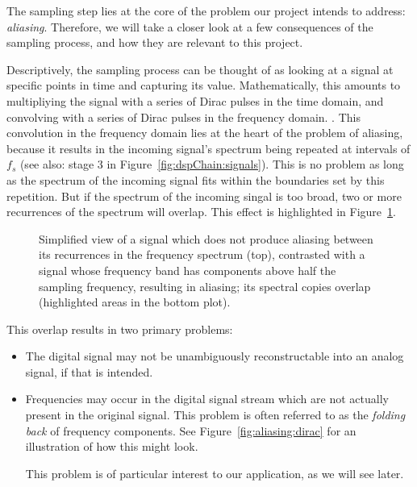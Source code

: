 The sampling  step lies  at the  core of  the problem  our project  intends to
address:  \emph{aliasing}. Therefore, we  will take  a  closer look  at a  few
consequences  of the  sampling  process, and  how they  are  relevant to  this
project.

Descriptively, the sampling  process can be thought of as  looking at a signal
at  specific points  in  time and  capturing  its value. Mathematically,  this
amounts to multipliying the  signal with a series of Dirac  pulses in the time
domain,  and  convolving with  a  series  of  Dirac  pulses in  the  frequency
domain\footnotemark.
.
This  convolution  in   the  frequency  domain  lies  at  the   heart  of  the
problem   of  aliasing,   because  it   results  in   the  incoming   signal's
spectrum  being  repeated  at  intervals  of  $f_s$  (see  also:  stage  3  in
Figure~\ref{fig:dspChain:signals}). This is no problem as long as the spectrum
of the incoming signal fits within  the boundaries set by this repetition. But
if  the  spectrum   of  the  incoming  singal  is  too   broad,  two  or  more
recurrences  of  the spectrum  will  overlap. This  effect is  highlighted  in
Figure~\ref{fig:aliasing:band}.

\begin{figure}
    \centering
    
    \caption[Aliasing Illustrated via Signal Frequency Band]{%
        Simplified view  of a signal  which does not produce  aliasing between
        its recurrences  in the  frequency spectrum  (top), contrasted  with a
        signal whose  frequency band  has components  above half  the sampling
        frequency,  resulting   in  aliasing;  its  spectral   copies  overlap
        (highlighted areas in the bottom plot).%
    }
    \label{fig:aliasing:band}
\end{figure}

This overlap results in two primary problems:
\begin{itemize}\tightlist
    \item
        The digital  signal may not  be unambiguously reconstructable  into an
        analog signal, if that is intended.
    \item
        Frequencies  may occur  in the  digital  signal stream  which are  not
        actually  present  in  the  original  signal. This  problem  is  often
        referred to  as the  \emph{folding back} of  frequency components. See
        Figure~\ref{fig:aliasing:dirac} for an illustration  of how this might
        look.

        This problem is of particular interest  to our application, as we will
        see later.
\end{itemize}

